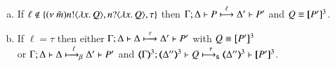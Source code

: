 \begin{proposition}
\begin{enumerate}
\begin{enumerate}[a)]
				\item	If $\ell \notin \{(\nu\ \tilde{m}) n ! \langle \lambda x.\,Q \rangle, n ? \langle \lambda x.\,Q \rangle, \tau\}$
					then
					$\Gamma; \Delta \vdash P \stackrel{\ell}{\longmapsto} \Delta' \vdash P'$ and $Q \equiv [\!\![P']\!\!]^{3}$.

				\item	If $\ell = \tau$ then
					either
					$\Gamma; \Delta \vdash \Delta \stackrel{\tau}{\longmapsto} \Delta' \vdash P'$ with $Q \equiv [\!\![P']\!\!]^{3}$\\
					or
					$\Gamma; \Delta \vdash \Delta \stackrel{\ell}{\longmapsto_{\mathsf{\beta}}} \Delta' \vdash P'$ and
					$\horel{\tmap{\Gamma}{3}}{\tmap{\Delta''}{3}}{Q}{\shby{\tau}}
					{\tmap{\Delta''}{3}}{\pmap{P'}{3}}$.
			\end{enumerate}
	\end{enumerate}
\end{proposition}

